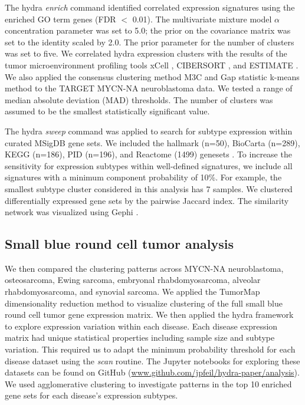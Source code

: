 \documentclass[10pt,letterpaper]{article}
\begin{document}
The hydra \textit{enrich} command identified correlated expression signatures using the enriched GO term genes (FDR $<$ 0.01). The multivariate mixture model $\alpha$ concentration parameter was set to 5.0; the prior on the covariance matrix was set to the identity scaled by 2.0. The prior parameter for the number of clusters was set to five. We correlated hydra expression clusters with the results of the tumor microenvironment profiling tools xCell \cite{aranXCellDigitallyPortraying2017}, CIBERSORT \cite{newmanRobustEnumerationCell2015}, and ESTIMATE \cite{yoshiharaInferringTumourPurity2013a}. We also applied the consensus clustering method M3C \cite{johnM3CMonteCarlo2018} and Gap statistic k-means method \cite{tibshirani2001estimating} to the TARGET MYCN-NA neuroblastoma data. We tested a range of median absolute deviation (MAD) thresholds. The number of clusters was assumed to be the smallest statistically significant value.

The hydra \textit{sweep} command was applied to search for subtype expression within curated MSigDB gene sets. We included the hallmark (n=50), BioCarta (n=289), KEGG (n=186), PID (n=196), and Reactome (1499) genesets \cite{liberzonMolecularSignaturesDatabase2011}. To increase the sensitivity for expression subtypes within well-defined signatures, we include all signatures with a minimum component probability of 10\%. For example, the smallest subtype cluster considered in this analysis has 7 samples. We clustered differentially expressed gene sets by the pairwise Jaccard index. The similarity network was visualized using Gephi \cite{bastian2009gephi}.

\subsection*{Small blue round cell tumor analysis}
We then compared the clustering patterns across MYCN-NA neuroblastoma, osteosarcoma, Ewing sarcoma, embryonal rhabdomyosarcoma, alveolar rhabdomyosarcoma, and synovial sarcoma. We applied the TumorMap dimensionality reduction method \cite{newtonTumorMapExploringMolecular2017} to visualize clustering of the full small blue round cell tumor gene expression matrix. We then applied the hydra framework to explore expression variation within each disease. Each disease expression matrix had unique statistical properties including sample size and subtype variation. This required us to adapt the minimum probability threshold for each disease dataset using the \textit{scan} routine. The Jupyter notebooks for exploring these datasets can be found on GitHub (\url{www.github.com/jpfeil/hydra-paper/analysis}). We used agglomerative clustering to investigate patterns in the top 10 enriched gene sets for each disease's expression subtypes.
\end{document}
